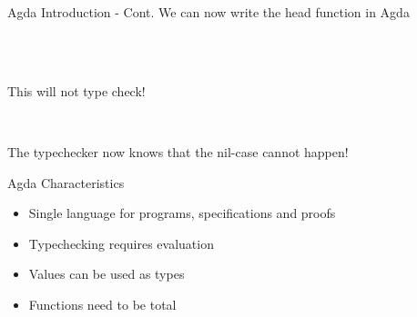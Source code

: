 \begin{frame}[fragile]{Agda Introduction - Cont.}
We can now write the head function in Agda
\begin{code}%
\> \AgdaSymbol{:}  \AgdaSymbol{\{} \AgdaSymbol{\}}      \<%
\\
\> \AgdaSymbol{(}  \AgdaSymbol{)} \AgdaSymbol{=} \<%
\\
\>  \AgdaSymbol{=} \<%
\end{code}
\pause
This will not type check!
\par
\pause
\vspace{0.5cm}
\begin{code}%
\> \AgdaSymbol{:}  \AgdaSymbol{\{} \AgdaSymbol{\}}    \AgdaSymbol{(} \AgdaSymbol{)}  \<%
\\
\> \AgdaSymbol{(}  \AgdaSymbol{)} \AgdaSymbol{=} \<%
\end{code}
The typechecker now knows that the nil-case cannot happen!
\end{frame}

\begin{frame}{Agda Characteristics}
\begin{itemize}
\item Single language for programs, specifications and proofs
\item Typechecking requires evaluation
\vspace{0.5cm}
\item Values can be used as types
\item Functions need to be total
\end{itemize}
\end{frame}
